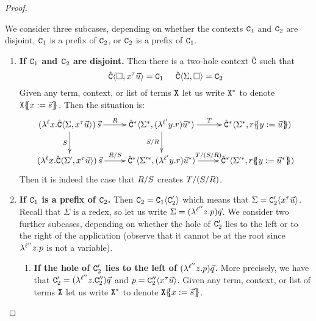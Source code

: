 \begin{proof}
\begin{enumerate}
\begin{enumerate}
    We consider three subcases, depending on whether the contexts
    $\mathtt{C}_1$ and $\mathtt{C}_2$ are disjoint,
    $\mathtt{C}_1$ is a prefix of $\mathtt{C}_2$,
    or $\mathtt{C}_2$ is a prefix of $\mathtt{C}_1$.
    \begin{enumerate}
    \item {\bf If $\mathtt{C}_1$ and $\mathtt{C}_2$ are disjoint.}
      Then there is a two-hole context $\hat{\mathtt{C}}$ such that
      \[
        \hat{\mathtt{C}}\langle\Box,x^{\tau}\vec{u}\rangle = \mathtt{C}_1
        \hspace{.5cm}
        \hat{\mathtt{C}}\langle\Sigma,\Box\rangle = \mathtt{C}_2
      \]
      Given any term, context, or list of terms $\mathtt{X}$ let us write $\mathtt{X}^*$ to denote $\mathtt{X}\{\!\!\{x := \vec{s}\}\!\!\}$.
      Then the situation is:
      \[
        \xymatrix{
          (\lamp{\lab}{\var}{\conhat\of{\Sigma,\var^{\typ}\ls{\tmthree}}})\,\ls{\tmtwo}
          \ar[r]^-{\redex}
          \ar[d]_-{\redextwo}
        &
          \conhat^*\of{\Sigma^*,(\lamp{\labtwo}{\vartwo}{\tmfour})\ls{\tmthree}^*}
          \ar[d]_-{\redextwo/\redex}
          \ar[r]^-{\redexthree}
        &
          \conhat^*\of{\Sigma^*,\tmfour\sub{\vartwo}{\ls{\tmthree}}}
        \\
          (\lamp{\lab}{\var}{\conhat\of{\Sigma',\var^{\typ}\ls{\tmthree}}})\,\ls{\tmtwo}
          \ar[r]^-{\redex/\redextwo}
        &
          \conhat^*\of{\Sigma'^*,(\lamp{\labtwo}{\vartwo}{\tmfour})\ls{\tmthree}^*}
          \ar[r]^-{\redexthree/(\redextwo/\redex)}
        &
          \conhat^*\of{\Sigma'^*,\tmfour\sub{\vartwo}{\ls{\tmthree}^*}}
        }
      \]
      Then it is indeed the case that $R/S$ creates $T/(S/R)$.
    \item {\bf If $\mathtt{C}_1$ is a prefix of $\mathtt{C}_2$.}
      Then $\mathtt{C}_2 = \mathtt{C}_1\langle\mathtt{C}'_2\rangle$ which means that $\Sigma = \mathtt{C}'_2\langle x^{\tau}\vec{u}\rangle$.
      Recall that $\Sigma$ is a redex, so let us write
      $\Sigma = (\lambda^{\ell''} z. p)\vec{q}$.
      We consider two further subcases, depending on whether the hole of $\mathtt{C}'_2$
      lies to the left or to the right of the application (observe that it cannot be at the root
      since $\lambda^{\ell''} z. p$ is not a variable).
      \begin{enumerate}
      \item {\bf If the hole of $\mathtt{C}'_2$ lies to the left of $(\lambda^{\ell''} z. p)\vec{q}$.}
        More precisely, we have that
        $\mathtt{C}'_2 = (\lambda^{\ell''} z. \mathtt{C}''_2)\vec{q}$ and $p = \mathtt{C}''_2\langle x^{\tau}\vec{u}\rangle$.
        Given any term, context, or list of terms $\mathtt{X}$ let us write $\mathtt{X}^*$ to denote $\mathtt{X}\{\!\!\{x := \vec{s}\}\!\!\}$.

\end{enumerate}
\end{enumerate}
\end{enumerate}
\end{enumerate}
\end{proof}
